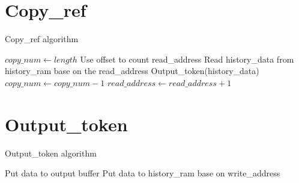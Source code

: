 \documentclass[10pt,letterpaper,pdftex]{article}
\begin{document}
\begin{CJK}{GBK}{song}
\newpage
\section{Copy\_ref}

\begin{algorithm}
\caption{Copy\_ref algorithm}\label{Copy_ref}
\begin{algorithmic}[1]
 \State $ copy\_num \gets length $
 \State Use offset to count read\_address
  \State Read history\_data from history\_ram base on the read\_address
  \State Output\_token(history\_data)
  \State $ copy\_num \gets copy\_num - 1 $
  \State $ read\_address \gets read\_address + 1 $
 \EndWhile
\EndProcedure
\end{algorithmic}
\end{algorithm}

\newpage
\section{Output\_token}

\begin{algorithm}
\caption{Output\_token algorithm}\label{Output_token}
\begin{algorithmic}[1]
 \State Put data to output buffer
 \State Put data to history\_ram base on write\_address
\EndProcedure
\end{algorithmic}
\end{algorithm}

\end{CJK}
\end{document}
